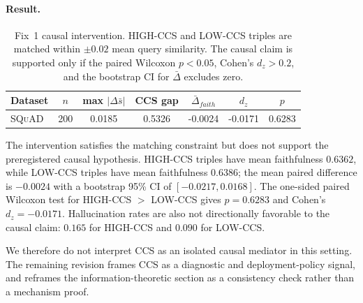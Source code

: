 \paragraph{Result.}
\begin{table}[t]
\centering
\caption{Fix~1 causal intervention. HIGH-CCS and LOW-CCS triples are
matched within $\pm 0.02$ mean query similarity. The causal claim is
supported only if the paired Wilcoxon $p<0.05$, Cohen's $d_z>0.2$, and
the bootstrap CI for $\bar{\Delta}$ excludes zero.}
\label{tab:fix01_causal}
\footnotesize
\begin{tabular}{lcccccc}
\toprule
Dataset & $n$ & max $|\Delta \bar{s}|$ & CCS gap & $\bar{\Delta}_{faith}$ & $d_z$ & $p$ \\
\midrule
\textsc{SQuAD} & 200 & 0.0185 & 0.5326 & -0.0024 & -0.0171 & 0.6283 \\
\bottomrule
\end{tabular}
\end{table}

The intervention satisfies the matching constraint but does not support
the preregistered causal hypothesis. HIGH-CCS triples have mean
faithfulness $0.6362$, while LOW-CCS triples have mean faithfulness
$0.6386$; the mean paired difference is $-0.0024$ with a bootstrap 95\%
CI of $[-0.0217, 0.0168]$. The one-sided paired Wilcoxon test for
HIGH-CCS $>$ LOW-CCS gives $p=0.6283$ and Cohen's $d_z=-0.0171$.
Hallucination rates are also not directionally favorable to the causal
claim: $0.165$ for HIGH-CCS and $0.090$ for LOW-CCS.

We therefore do not interpret CCS as an isolated causal mediator in this
setting. The remaining revision frames CCS as a diagnostic and
deployment-policy signal, and reframes the information-theoretic section
as a consistency check rather than a mechanism proof.
